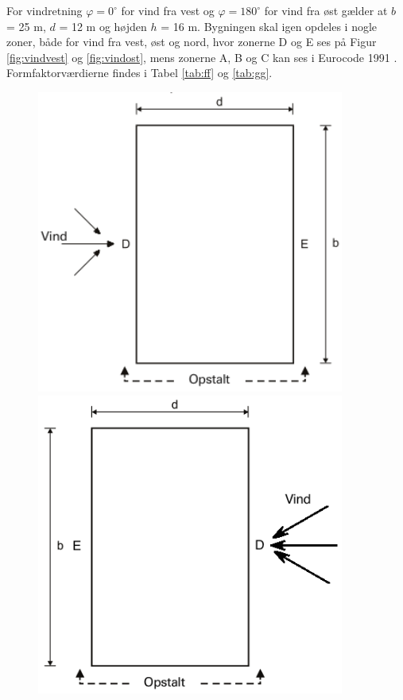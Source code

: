 For vindretning $\varphi = 0^{\circ}$ for vind fra vest og $\varphi = 180^{\circ}$ for vind fra øst gælder at $b$ = 25 m, $d$ = 12 m og højden $h$ = 16 m. Bygningen skal igen opdeles i nogle zoner, både for vind fra vest, øst og nord, hvor zonerne D og E ses på Figur \ref{fig:vindvest} og \ref{fig:vindost}, mens zonerne A, B og C kan ses i Eurocode 1991 \citep [kapitel 7.2.2 figur 7.5]{EU91}. Formfaktorværdierne findes i Tabel \ref{tab:ff} og \ref{tab:gg}.

\begin{figure}[htbp]\centering
	\begin{minipage}[b]{0.48\textwidth}\centering
		\includegraphics[width=0.9\textwidth]{billeder/vindvest1.png} %
	\end{minipage}\hfill
	\begin{minipage}[b]{0.48\textwidth}\centering
		\includegraphics[width=0.9\textwidth]{billeder/vindost1.png} %

\end{minipage}
\end{figure}
